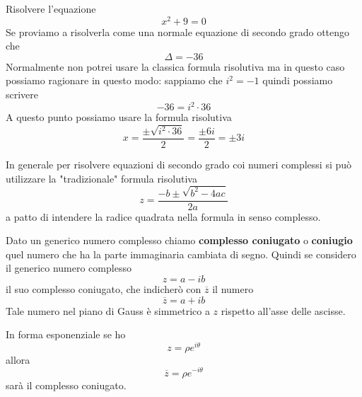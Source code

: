 \begin{example}
	Risolvere l'equazione
	\begin{equation*}
		x^2 + 9 = 0
	\end{equation*}
	Se proviamo a risolverla come una normale equazione di secondo grado ottengo che
	\begin{equation*}
		\Delta = -36
	\end{equation*}
	Normalmente non potrei usare la classica formula risolutiva ma in questo caso possiamo
	ragionare in questo modo: sappiamo che $i^2 = -1$ quindi possiamo scrivere
	\begin{equation*}
		-36 = i^2 \cdot 36
	\end{equation*}
	A questo punto possiamo usare la formula risolutiva
	\begin{equation*}
		x = \frac{\pm \sqrt{i^2 \cdot 36}}{2} = \frac{\pm 6i}{2} = \pm 3i
	\end{equation*}
\end{example}

In generale per risolvere equazioni di secondo grado coi numeri complessi si pu\`o utilizzare
la "tradizionale" formula risolutiva
\begin{equation*}
	z = \frac{-b \pm \sqrt{b^2 - 4ac}}{2a}
\end{equation*}
a patto di intendere la radice quadrata nella formula in senso complesso.

\begin{defn}
	Dato un generico numero complesso chiamo \textbf{complesso coniugato} o \textbf{coniugio}
	quel numero che ha la parte immaginaria cambiata di segno. Quindi se considero il generico
	numero complesso
	\begin{equation*}
		z = a - ib
	\end{equation*}
	il suo complesso coniugato, che indicher\`o con $\overline{z}$ il numero
	\begin{equation*}
		\overline{z} = a + ib
	\end{equation*}
	Tale numero nel piano di Gauss \`e simmetrico a $z$ rispetto all'asse delle ascisse.
\end{defn}

\begin{observation}
	In forma esponenziale se ho
	\begin{equation*}
		z = \rho e^{i \theta}
	\end{equation*}
	allora
	\begin{equation*}
		\overline{z} = \rho e^{-i \theta}
	\end{equation*}
	sar\`a il complesso coniugato.
\end{observation}

